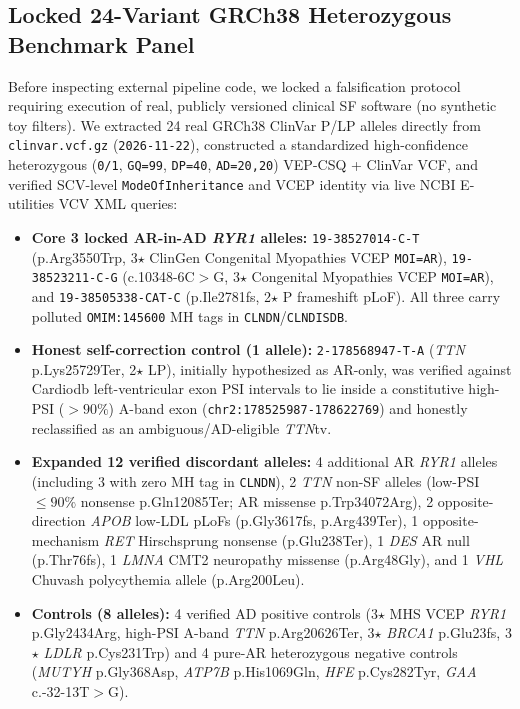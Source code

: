 \documentclass[11pt,letterpaper]{article}
\begin{document}
\subsection{Locked 24-Variant GRCh38 Heterozygous Benchmark Panel}
Before inspecting external pipeline code, we locked a falsification protocol requiring execution of real, publicly versioned clinical SF software (no synthetic toy filters). We extracted 24 real GRCh38 ClinVar P/LP alleles directly from \texttt{clinvar.vcf.gz} (\texttt{2026-11-22}), constructed a standardized high-confidence heterozygous (\texttt{0/1}, \texttt{GQ=99}, \texttt{DP=40}, \texttt{AD=20,20}) VEP-CSQ + ClinVar VCF, and verified SCV-level \texttt{ModeOfInheritance} and VCEP identity via live NCBI E-utilities VCV XML queries:
\begin{itemize}\setlength{\itemsep}{1.5pt}
  \item \textbf{Core 3 locked AR-in-AD \textit{RYR1} alleles:} \texttt{19-38527014-C-T} (p.Arg3550Trp, 3$\star$ ClinGen Congenital Myopathies VCEP \texttt{MOI=AR}), \texttt{19-38523211-C-G} (c.10348-6C$>$G, 3$\star$ Congenital Myopathies VCEP \texttt{MOI=AR}), and \texttt{19-38505338-CAT-C} (p.Ile2781fs, 2$\star$ P frameshift pLoF). All three carry polluted \texttt{OMIM:145600} MH tags in \texttt{CLNDN}/\texttt{CLNDISDB}.
  \item \textbf{Honest self-correction control (1 allele):} \texttt{2-178568947-T-A} (\textit{TTN} p.Lys25729Ter, 2$\star$ LP), initially hypothesized as AR-only, was verified against Cardiodb left-ventricular exon PSI intervals to lie inside a constitutive high-PSI ($>90\%$) A-band exon (\texttt{chr2:178525987-178622769}) and honestly reclassified as an ambiguous/AD-eligible \textit{TTN}tv.
  \item \textbf{Expanded 12 verified discordant alleles:} 4 additional AR \textit{RYR1} alleles (including 3 with zero MH tag in \texttt{CLNDN}), 2 \textit{TTN} non-SF alleles (low-PSI $\le 90\%$ nonsense p.Gln12085Ter; AR missense p.Trp34072Arg), 2 opposite-direction \textit{APOB} low-LDL pLoFs (p.Gly3617fs, p.Arg439Ter), 1 opposite-mechanism \textit{RET} Hirschsprung nonsense (p.Glu238Ter), 1 \textit{DES} AR null (p.Thr76fs), 1 \textit{LMNA} CMT2 neuropathy missense (p.Arg48Gly), and 1 \textit{VHL} Chuvash polycythemia allele (p.Arg200Leu).
  \item \textbf{Controls (8 alleles):} 4 verified AD positive controls (3$\star$ MHS VCEP \textit{RYR1} p.Gly2434Arg, high-PSI A-band \textit{TTN} p.Arg20626Ter, 3$\star$ \textit{BRCA1} p.Glu23fs, 3$\star$ \textit{LDLR} p.Cys231Trp) and 4 pure-AR heterozygous negative controls (\textit{MUTYH} p.Gly368Asp, \textit{ATP7B} p.His1069Gln, \textit{HFE} p.Cys282Tyr, \textit{GAA} c.-32-13T$>$G).
\end{itemize}
\end{document}
